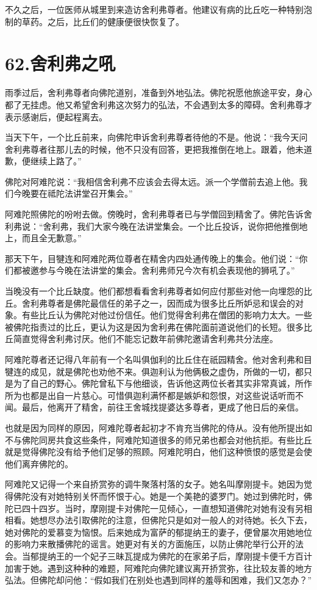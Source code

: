 \documentclass[12pt,twoside,openany]{book}
\begin{document}
不久之后，一位医师从城里到来造访舍利弗尊者。他建议有病的比丘吃一种特别泡制的草药。之后，比丘们的健康便很快恢复了。


\chapter{62.舍利弗之吼}\label{ch62}

雨季过后，舍利弗尊者向佛陀道别，准备到外地弘法。佛陀祝愿他旅途平安，身心都了无挂虑。他又希望舍利弗这次努力的弘法，不会遇到太多的障碍。舍利弗尊才表示感谢后，便起程离去。

当天下午，一个比丘前来，向佛陀申诉舍利弗尊者待他的不是。他说：“我今天问舍利弗尊者往那儿去的时候，他不只没有回答，更把我推倒在地上。跟着，他未道歉，便继续上路了。”

佛陀对阿难陀说：“我相信舍利弗不应该会去得太远。派一个学僧前去追上他。我们今晚要在祗陀法讲堂召开集会。”

阿难陀照佛陀的吩咐去做。傍晚时，舍利弗尊者已与学僧回到精舍了。佛陀告诉舍利弗说：“舍利弗，我们大家今晚在法讲堂集会。一个比丘投诉，说你把他推倒地上，而且全无歉意。”

那天下午，目犍连和阿难陀两位尊者在精舍内四处通传晚上的集会。他们说：“你们都被邀参与今晚在法讲堂的集会。舍利弗师兄今次有机会表现他的狮吼了。”

当晚没有一个比丘缺度。他们都想看看舍利弗尊者如何应付那些对他一向埋怨的比丘。舍利弗尊者是佛陀最信任的弟子之一，因而成为很多比丘所妒忌和误会的对象。有些比丘认为佛陀对他过份信任。他们觉得舍利弗在僧团的影响力太大。一些被佛陀指责过的比丘，更认为这是因为舍利弗在佛陀面前道说他们的长短。很多比丘简直觉得舍利弗讨厌。他们不能忘记数年前佛陀邀请舍利弗共分法座。

阿难陀尊者还记得八年前有一个名叫俱伽利的比丘住在祇园精舍。他对舍利弗和目犍连的成见，就是佛陀也劝他不来。俱迦利认为他俩极之虚伪，所做的一切，都只是为了自己的野心。佛陀曾私下与他细谈，告诉他这两位长者其实非常真诚，所作所为也都是出自一片慈心。可惜俱迦利满怀都是嫉妒和怨恨，对这些说话听而不闻。最后，他离开了精舍，前往王舍城找提婆达多尊者，更成了他日后的亲信。

也就是因为同样的原因，阿难陀尊者起初才不肯充当佛陀的侍从。没有他所提出如不与佛陀同房共食这些条件，阿难陀知道很多的师兄弟也都会对他抗拒。有些比丘就是觉得佛陀没有给予他们足够的照顾。阿难陀明白，他们这种愤恨的感觉是会使他们离弃佛陀的。

阿难陀又记得一个来自挢赏弥的调牛聚落村落的女子。她名叫摩刚提卡。她因为觉得佛陀没有对她特别关怀而怀恨于心。她是一个美艳的婆罗门。她过到佛陀时，佛陀已四十四岁。当时，摩刚提卡对佛陀一见倾心，一直想知道佛陀对她有没有另相相看。她想尽办法引取佛陀的注意，但佛陀只是如对一般人的对待她。长久下去，她对佛陀的爱慕变为恼恨。后来她成为富萨的郁提纳王的妻子，便曾屡次用她地位的影响力来散播佛陀的谣言。她更对有关的方面施压，以防止佛陀举行公开的法会。当郁提纳王的一个妃子三昧瓦提成为佛陀的在家弟子后，摩刚提卡便千方百计加害于她。遇到这种种的难题，阿难陀向佛陀建议离开挢赏弥，往比较友善的地方弘法。但佛陀却问他：“假如我们在别处也遇到同样的羞辱和困难，我们又怎办？”
\end{document}
